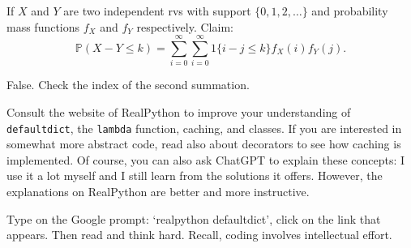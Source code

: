 \documentclass[stochastic-or]{subfiles}
\begin{document}
\begin{truefalse}
If \(X\) and \(Y\) are two independent rvs with support \(\{0, 1, 2, \ldots\}\) and probability mass functions \(f_X\) and \(f_Y\) respectively. Claim:
$$\mathbb{P}(X-Y\le k)=\sum_{i=0}^{\infty}\sum_{i=0}^{\infty}1\{i-j\le k\}f_X(i)f_Y(j).$$
\begin{solution}
False. Check the index of the second summation.
\end{solution}
\end{truefalse}


\begin{exercise}
Consult the website of RealPython to improve your understanding of \texttt{defaultdict}, the \texttt{lambda} function, caching, and classes.
If you are interested in somewhat more abstract code, read also about decorators to see how caching is implemented.
Of course, you can also ask ChatGPT to explain these concepts: I use it a lot myself and I still learn from the solutions it offers.
However, the explanations on RealPython are better and more instructive.
\begin{solution}
Type on the Google prompt: `realpython defaultdict', click on the link that appears.  Then read and think hard. Recall, coding involves intellectual effort.
\end{solution}
\end{exercise}
\end{document}
